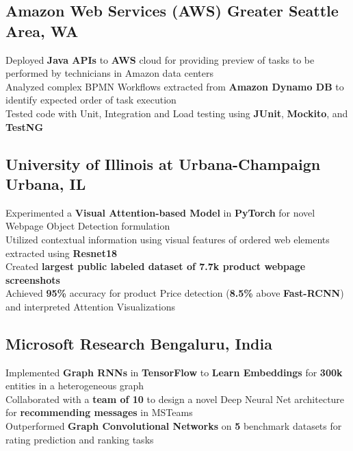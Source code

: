\documentclass[]{Resume}
\begin{document}
\subsection{Amazon Web Services (AWS) \hfill \normalfont Greater Seattle Area, WA}
\pt Deployed \textbf{Java APIs} to \textbf{AWS} cloud for providing preview of tasks to be performed by technicians in Amazon data centers \\
\pt Analyzed complex BPMN Workflows extracted from \textbf{Amazon Dynamo DB} to identify expected order of task execution \\
\pt Tested code with Unit, Integration and Load testing using \textbf{JUnit}, \textbf{Mockito}, and \textbf{TestNG}
\sectionsep

\subsection{University of Illinois at Urbana-Champaign \hfill \normalfont Urbana, IL}
\pt Experimented a \textbf{Visual Attention-based Model} in \textbf{PyTorch} for novel Webpage Object Detection formulation \\
\pt Utilized contextual information using visual features of ordered web elements extracted using \textbf{Resnet18} \\  
\pt Created \textbf{largest public labeled dataset of 7.7k product webpage screenshots} \\
\pt Achieved \textbf{95\%} accuracy for product Price detection (\textbf{8.5\%} above \textbf{Fast-RCNN}) and interpreted Attention Visualizations
\sectionsep

\subsection{Microsoft Research \hfill \normalfont Bengaluru, India}
\pt Implemented \textbf{Graph RNNs} in \textbf{TensorFlow} to \textbf{Learn Embeddings} for \textbf{300k} entities in a heterogeneous graph \\
\pt Collaborated with a \textbf{team of 10} to design a novel Deep Neural Net architecture for \textbf{recommending messages} in MSTeams \\
\pt Outperformed \textbf{Graph Convolutional Networks} on \textbf{5} benchmark datasets for rating prediction and ranking tasks
\sectionsep
\end{document}
